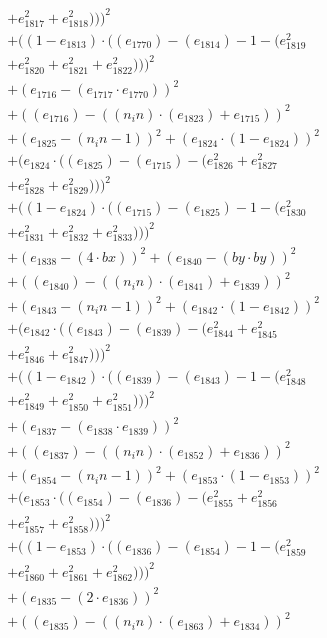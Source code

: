 \documentclass[10pt, a4paper]{article}
\begin{document}
\begin{small}
\begin{align*}
& + e_{1817}^{2} + e_{1818}^{2})))^{2} \\
& + ((1 - e_{1813})  \cdot  ((e_{1770}) - (e_{1814}) - 1 - (e_{1819}^{2} \\
& + e_{1820}^{2} + e_{1821}^{2} + e_{1822}^{2})))^{2} \\
& + (e_{1716} - (e_{1717}  \cdot  e_{1770}))^{2} \\
& + ((e_{1716}) - ((n_in)  \cdot  (e_{1823}) + e_{1715}))^{2} \\
& + (e_{1825} - (n_in - 1))^{2} + (e_{1824}  \cdot  (1 - e_{1824}))^{2} \\
& + (e_{1824}  \cdot  ((e_{1825}) - (e_{1715}) - (e_{1826}^{2} + e_{1827}^{2} \\
& + e_{1828}^{2} + e_{1829}^{2})))^{2} \\
& + ((1 - e_{1824})  \cdot  ((e_{1715}) - (e_{1825}) - 1 - (e_{1830}^{2} \\
& + e_{1831}^{2} + e_{1832}^{2} + e_{1833}^{2})))^{2} \\
& + (e_{1838} - (4  \cdot  bx))^{2} + (e_{1840} - (by  \cdot  by))^{2} \\
& + ((e_{1840}) - ((n_in)  \cdot  (e_{1841}) + e_{1839}))^{2} \\
& + (e_{1843} - (n_in - 1))^{2} + (e_{1842}  \cdot  (1 - e_{1842}))^{2} \\
& + (e_{1842}  \cdot  ((e_{1843}) - (e_{1839}) - (e_{1844}^{2} + e_{1845}^{2} \\
& + e_{1846}^{2} + e_{1847}^{2})))^{2} \\
& + ((1 - e_{1842})  \cdot  ((e_{1839}) - (e_{1843}) - 1 - (e_{1848}^{2} \\
& + e_{1849}^{2} + e_{1850}^{2} + e_{1851}^{2})))^{2} \\
& + (e_{1837} - (e_{1838}  \cdot  e_{1839}))^{2} \\
& + ((e_{1837}) - ((n_in)  \cdot  (e_{1852}) + e_{1836}))^{2} \\
& + (e_{1854} - (n_in - 1))^{2} + (e_{1853}  \cdot  (1 - e_{1853}))^{2} \\
& + (e_{1853}  \cdot  ((e_{1854}) - (e_{1836}) - (e_{1855}^{2} + e_{1856}^{2} \\
& + e_{1857}^{2} + e_{1858}^{2})))^{2} \\
& + ((1 - e_{1853})  \cdot  ((e_{1836}) - (e_{1854}) - 1 - (e_{1859}^{2} \\
& + e_{1860}^{2} + e_{1861}^{2} + e_{1862}^{2})))^{2} \\
& + (e_{1835} - (2  \cdot  e_{1836}))^{2} \\
& + ((e_{1835}) - ((n_in)  \cdot  (e_{1863}) + e_{1834}))^{2} \\

\end{align*}
\end{small}
\end{document}
